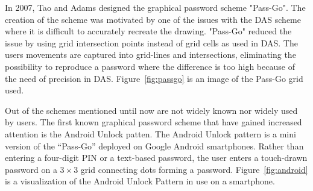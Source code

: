     \begin{figure}[H]
      \centering
    \end{figure}
    
  In 2007, Tao and Adams \cite{Tao} designed the graphical password scheme "Pass-Go". The creation of the scheme was motivated by one of the issues with the DAS scheme where it is difficult to accurately recreate the drawing. "Pass-Go" reduced the issue by using grid intersection points instead of grid cells as used in DAS. The users movements are captured into grid-lines and intersections, eliminating the possibility to reproduce a password where the difference is too high because of the need of precision in DAS. Figure~\ref{fig:passgo} is an image of the Pass-Go grid used.

  Out of the schemes mentioned until now are not widely known nor widely used by users. The first known graphical password scheme that have gained increased attention is the Android Unlock patten. The Android Unlock pattern is a mini version of the ``Pass-Go'' deployed on Google Android smartphones. Rather than entering a four-digit PIN or a text-based password, the user enters a touch-drawn password on a $3\times3$ grid connecting dots forming a password. Figure~\ref{fig:android} is a visualization of the Android Unlock Pattern in use on a smartphone.

